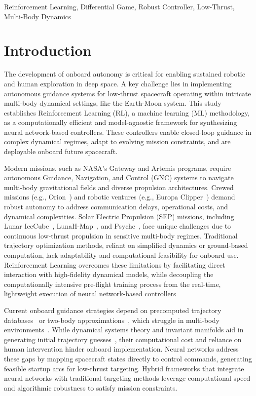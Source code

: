 \documentclass[conference]{IEEEtran}
\begin{document}
\begin{IEEEkeywords}
Reinforcement Learning, Differential Game, Robust Controller, Low-Thrust, Multi-Body Dynamics
\end{IEEEkeywords}

\section{Introduction}
The development of onboard autonomy is critical for enabling sustained robotic and human exploration in deep space.
A key challenge lies in implementing autonomous guidance systems for low-thrust spacecraft operating within intricate multi-body dynamical settings, like the Earth-Moon system.
This study establishes Reinforcement Learning (RL), a machine learning (ML) methodology, as a computationally efficient and model-agnostic framework for synthesizing neural network-based controllers. These controllers enable closed-loop guidance in complex dynamical regimes, adapt to evolving mission constraints, and are deployable onboard future spacecraft.

Modern missions, such as NASA's Gateway and Artemis programs, require autonomous Guidance, Navigation, and Control (GNC) systems to navigate multi-body gravitational fields and diverse propulsion architectures. Crewed missions (e.g., Orion~\cite{Hart}) and robotic ventures (e.g., Europa Clipper~\cite{Clipper}) demand robust autonomy to address communication delays, operational costs, and dynamical complexities. Solar Electric Propulsion (SEP) missions, including Lunar IceCube~\cite{Bosanac}, LunaH-Map~\cite{Map}, and Psyche~\cite{Psyche}, face unique challenges due to continuous low-thrust propulsion in sensitive multi-body regimes. Traditional trajectory optimization methods, reliant on simplified dynamics or ground-based computation, lack adaptability and computational feasibility for onboard use. Reinforcement Learning overcomes these limitations by facilitating direct interaction with high-fidelity dynamical models, while decoupling the computationally intensive pre-flight training process from the real-time, lightweight execution of neural network-based controllers

Current onboard guidance strategies depend on precomputed trajectory databases~\cite{13} or two-body approximations~\cite{9}, which struggle in multi-body environments~\cite{12}. While dynamical systems theory and invariant manifolds aid in generating initial trajectory guesses~\cite{11,12}, their computational cost and reliance on human intervention hinder onboard implementation. Neural networks address these gaps by mapping spacecraft states directly to control commands, generating feasible startup arcs for low-thrust targeting. Hybrid frameworks that integrate neural networks with traditional targeting methods leverage computational speed and algorithmic robustness to satisfy mission constraints.
\end{document}
